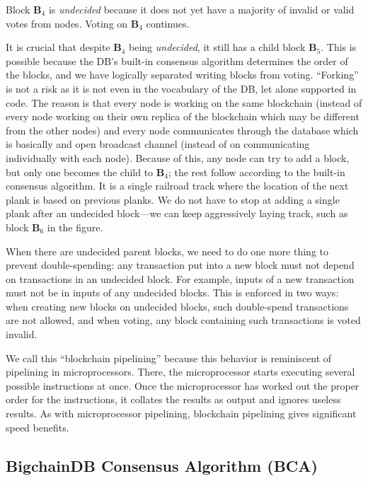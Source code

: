 Block $\mathbf{B}_4$ is \textsf{\textit{undecided}} because it does not yet have a majority of invalid or valid votes from nodes.
Voting on $\mathbf{B}_4$ continues.

It is crucial that despite $\mathbf{B}_4$ being \textsf{\textit{undecided}}, it still has a child block $\mathbf{B}_5$.
This is possible because the DB’s built-in consensus algorithm determines the order of the blocks, and we have logically separated writing blocks from voting.
“Forking” is not a risk as it is not even in the vocabulary of the DB, let alone supported in code.
The reason is that every node is working on the same blockchain (instead of every node working on their own replica of the blockchain which may be different from the other nodes) and every node communicates through the database which is basically and open broadcast channel (instead of on communicating individually with each node).
Because of this, any node can try to add a block, but only one becomes the child to $\mathbf{B}_4$; the rest follow according to the built-in consensus algorithm.
It is a single railroad track where the location of the next plank is based on previous planks.
We do not have to stop at adding a single plank after an undecided block—we can keep aggressively laying track, such as block $\mathbf{B}_6$ in the figure.

When there are undecided parent blocks, we need to do one more thing to prevent double-spending: any transaction put into a new block must not depend on transactions in an undecided block.
For example, inputs of a new transaction must not be in inputs of any undecided blocks.
This is enforced in two ways: when creating new blocks on undecided blocks, such double-spend transactions are not allowed, and when voting, any block containing such transactions is voted invalid.

We call this “blockchain pipelining” because this behavior is reminiscent of pipelining in microprocessors.
There, the microprocessor starts executing several possible instructions at once.
Once the microprocessor has worked out the proper order for the instructions, it collates the results as output and ignores useless results.
As with microprocessor pipelining, blockchain pipelining gives significant speed benefits.

\subsection{BigchainDB Consensus Algorithm (BCA)}

